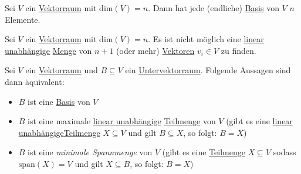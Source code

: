 \documentclass[../../main.tex]{subfiles}
\begin{document}
	\begin{theorem}
		Sei $V$ ein \hyperref[def:Vektorraum]{Vektorraum} mit $\textrm{dim}(V)=n$. Dann hat jede (endliche) \hyperref[def:Basis]{Basis} von $V$ $n$ Elemente.
	\end{theorem}

	\begin{theorem}
		Sei $V$ ein \hyperref[def:Vektorraum]{Vektorraum} mit $\textrm{dim}(V)=n$. Es ist nicht möglich eine \hyperref[def:LineareUnabhängigkeitMenge]{linear unabhängige} \hyperref[def:Menge]{Menge} von $n+1$ (oder mehr) \hyperref[def:Vektor]{Vektoren} $v_i \in V$ zu finden.
	\end{theorem}

	\begin{theorem}
		Sei $V$ ein \hyperref[def:Vektorraum]{Vektorraum} und $B \subseteq V$ ein \hyperref[def:Untervektorraum]{Untervektorraum}. Folgende Aussagen sind dann äquivalent:
		\begin{itemize}
			\item $B$ ist eine \hyperref[def:Basis]{Basis} von $V$
			\item $B$ ist eine maximale \hyperref[def:LineareUnabhängigkeitMenge]{linear unabhängige} \hyperref[def:Teilmenge]{Teilmenge} von $V$ (gibt es eine \hyperref[def:LineareUnabhängigkeitMenge]{linear unabhängige}\hyperref[def:Teilmenge]{Teilmenge} $X \subseteq V$ und gilt $B \subseteq X$, so folgt: $B = X$)
			\item $B$ ist eine \textit{minimale Spannmenge} von $V$ (gibt es eine \hyperref[def:Teilmenge]{Teilmenge} $X\subseteq V$ sodass $\textrm{span}(X)=V$ und gilt $X \subseteq B$, so folgt: $B = X$)
		\end{itemize}
	\end{theorem}
\end{document}
